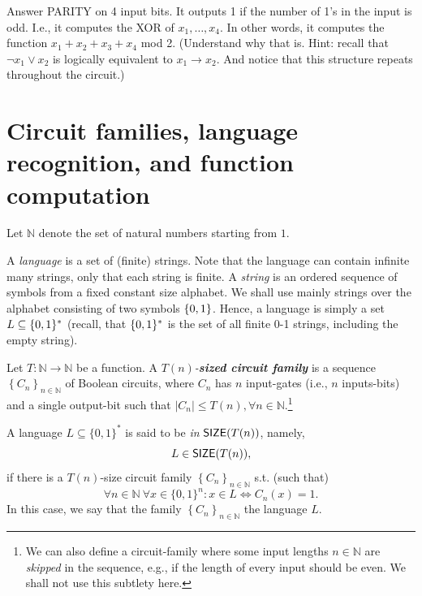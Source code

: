 \begin{trailer}{Answer}
     PARITY on 4 input bits. It outputs 1 if the number of 1's in the input is odd. I.e., it computes the XOR of $x_1, \ldots, x_4$. In other words, it computes the function $x_1+x_2+x_3+x_4$ mod 2. (Understand why that is. Hint: recall that ${\neg x_1}\lor x_2$ is logically equivalent to $x_1\to x_2$. And notice that this structure repeats throughout the circuit.)
\end{trailer}

\section{Circuit families, language recognition, and function computation}

Let $\mathbb{N}$ denote the set of natural numbers starting from $1$.



A \emph{language} is a set of (finite) strings. Note that the language can contain infinite many strings, only that each string is finite. A \emph{string} is an ordered sequence of symbols from a fixed constant size alphabet. We shall use mainly strings over the alphabet consisting of two symbols $\{0,1\}$.
Hence, a language is simply a set $L\subseteq\{0,1\}^*$ (recall, that $\{0,1\}^*$ is the set of all finite 0-1 strings, including the empty string). 
 

\begin{svgraybox}
\begin{definition}
Let $T:\mathbb{N}\rightarrow \mathbb{N}$ be a function. 
A \emph{$T(n)$-\textbf{sized circuit family}} is a sequence $\left\{C_n\right\}_{n \in \mathbb{N}}$ of Boolean circuits, where $C_n$ has $n$ input-gates (i.e., $n$ inputs-bits) and a single output-bit such that  $\left|C_n\right| \leq T(n), \forall n \in \mathbb{N}$.\footnote{We can also define a circuit-family where some input lengths $n\in\mathbb{N}$ are \emph{skipped} in the sequence, e.g., if the length of every input should be even. We shall not use this subtlety here.}
\end{definition}
\end{svgraybox}

A language $L\subseteq\{0,1\}^*$ is said to be \emph{in} $\operatorname{{\mathsf{SIZE}}} (T(n))$, namely, $$L\in\operatorname{{\mathsf{SIZE}}} (T(n)),$$ if there is a $T(n)$-size circuit family $\left\{C_n\right\}_{n \in \mathbb{N}}$ s.t. (such that) 
$$\forall n \in \mathbb{N~} \forall x \in\{0,1\}^n: x \in L \Leftrightarrow C_n(x)=1.$$
In this case, we say that 
the family $\left\{C_n\right\}_{n \in \mathbb{N}}$  the language $L$.


